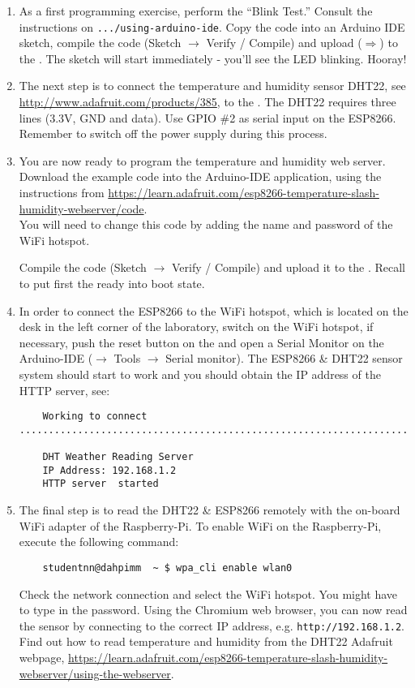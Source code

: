 \begin{enumerate}
\item As a first  programming exercise, perform the ``Blink Test.'' Consult the instructions on
{\tt .../using-arduino-ide}.
Copy the code into an Arduino IDE sketch, compile the code (Sketch $\rightarrow$ Verify / Compile) and upload ($\Rightarrow$) to the \microcontroller. 
The sketch will start immediately - you'll see the LED blinking. Hooray!

\item The next step is to connect the temperature and humidity sensor DHT22, see \url{http://www.adafruit.com/products/385}, to the \microcontroller. The DHT22 requires  three lines (3.3V, GND and data). Use GPIO \#2 as serial input on the ESP8266. Remember to switch off the power supply during this process.


\item You are now ready to program the temperature and humidity web server. 
Download the example code into the Arduino-IDE application, using the instructions from \url{https://learn.adafruit.com/esp8266-temperature-slash-humidity-webserver/code}. \\
You will need to change this code by adding the name and password of the WiFi hotspot.
%

%
Compile the code (Sketch $\rightarrow$ Verify / Compile) and upload it
to the \microcontroller.  Recall to put first the \microcontroller ready into boot state.

\item In order to connect the ESP8266 \microcontroller to the WiFi hotspot, which  is located on the desk in the left corner of the laboratory, switch on the WiFi hotspot, if necessary, push the reset button on the \microcontroller and 
open a Serial Monitor on the  Arduino-IDE  ($\rightarrow$ Tools  $\rightarrow$ Serial monitor).
The ESP8266 \& DHT22 sensor system should start to work 
and you  should  obtain the IP address of the HTTP server, see:
\begin{verbatim}
    Working to connect ................................................................................................

    DHT Weather Reading Server
    IP Address: 192.168.1.2
    HTTP server  started
\end{verbatim}

\item The final step is to read the DHT22 \& ESP8266 remotely 
with the on-board WiFi adapter of  the Raspberry-Pi. To enable WiFi on the Raspberry-Pi,
execute the following command:
%
\begin{verbatim}
    studentnn@dahpimm  ~ $ wpa_cli enable wlan0 
\end{verbatim}
%
   Check the network connection and select the WiFi hotspot. You might have to type in the password. Using the Chromium web browser, you can now read the sensor by connecting to the correct IP address, e.g. {\tt http://192.168.1.2}.
Find out how to read temperature and humidity from the DHT22 Adafruit webpage, 
\url{https://learn.adafruit.com/esp8266-temperature-slash-humidity-webserver/using-the-webserver}.

 
\end{enumerate}

